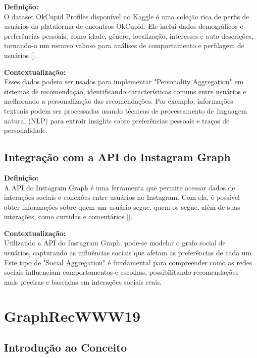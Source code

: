 \textbf{Definição:} \\
O dataset OkCupid Profiles disponível no Kaggle é uma coleção rica de perfis de usuários da plataforma de encontros OkCupid. Ele inclui dados demográficos e preferências pessoais, como idade, gênero, localização, interesses e auto-descrições, tornando-o um recurso valioso para análises de comportamento e perfilagem de usuários \textcolor{blue}{[\cite{OkCupidProfiles}]}.

\textbf{Contextualização:} \\
Esses dados podem ser usados para implementar "Personality Aggregation" em sistemas de recomendação, identificando características comuns entre usuários e melhorando a personalização das recomendações. Por exemplo, informações textuais podem ser processadas usando técnicas de processamento de linguagem natural (NLP) para extrair insights sobre preferências pessoais e traços de personalidade.

\subsection{Integração com a API do Instagram Graph}

\textbf{Definição:} \\
A API do Instagram Graph é uma ferramenta que permite acessar dados de interações sociais e conexões entre usuários no Instagram. Com ela, é possível obter informações sobre quem um usuário segue, quem os segue, além de suas interações, como curtidas e comentários \textcolor{blue}{[\cite{InstagramGraphAPI}]}.

\textbf{Contextualização:} \\
Utilizando a API do Instagram Graph, pode-se modelar o grafo social de usuários, capturando as influências sociais que afetam as preferências de cada um. Este tipo de "Social Aggregation" é fundamental para compreender como as redes sociais influenciam comportamentos e escolhas, possibilitando recomendações mais precisas e baseadas em interações sociais reais.

\section{GraphRecWWW19}

\subsection{Introdução ao Conceito}

